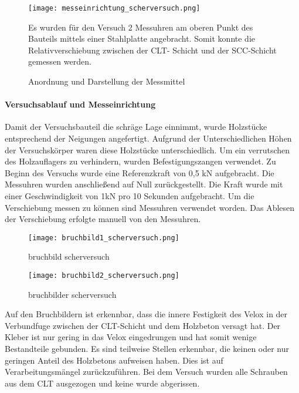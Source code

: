 \documentclass[12 pt,a4 paper ]{scrreprt}
\begin{document}
\begin{figure}[h]
\begin{minipage}[hbt]{8cm}
	\texttt{[image: messeinrichtung\_scherversuch.png]}
	\caption{Anordnung und Darstellung der Messmittel }
	\label{messeinrichtung_scherversuch}
\end{minipage}
\hfill
\begin{minipage}[hbt]{8cm}
Es wurden für den Versuch 2 Messuhren am oberen Punkt des Bauteils mittels einer Stahlplatte angebracht. Somit konnte die Relativverschiebung zwischen der CLT- Schicht und der SCC-Schicht gemessen werden.

\end{minipage}
\end{figure}

\paragraph{Versuchsablauf und Messeinrichtung}
 
Damit der Versuchsbauteil die schräge Lage einnimmt, wurde Holzstücke entsprechend der Neigungen angefertigt. Aufgrund der Unterschiedlichen Höhen der Versuchskörper waren diese Holzstücke unterschiedlich. Um ein verrutschen des Holzauflagers zu verhindern, wurden Befestigungszangen verwendet.
Zu Beginn des Versuchs wurde eine Referenzkraft von 0,5 kN aufgebracht. Die Messuhren wurden anschließend auf Null zurückgestellt.
Die Kraft wurde mit einer Geschwindigkeit von 1kN pro 10 Sekunden aufgebracht. Um die Verschiebung messen zu können sind Messuhren verwendet worden. Das Ablesen der Verschiebung erfolgte manuell von den Messuhren.

\begin{figure}
\begin{minipage}[hbt]{7cm}	
	\texttt{[image: bruchbild1\_scherversuch.png]}
	\caption{bruchbild scherversuch}
	\label{bruchbild scherversuch}
\end{minipage}
\hfill
\begin{minipage}[hbt]{7cm}
	\texttt{[image: bruchbild2\_scherversuch.png]}
	\caption{bruchbilder scherversuch}
	\label{bruchbilder scherversuch}
\end{minipage}
\end{figure}

Auf den Bruchbildern ist erkennbar, dass die innere Festigkeit des Velox in der Verbundfuge zwischen der CLT-Schicht und dem Holzbeton versagt hat. Der Kleber ist nur gering in das Velox eingedrungen und hat somit wenige Bestandteile gebunden. Es sind teilweise Stellen erkennbar, die keinen oder nur geringen Anteil des Holzbetons aufweisen haben. Dies ist auf Verarbeitungsmängel zurückzuführen. Bei dem Versuch wurden alle Schrauben aus dem CLT ausgezogen und keine wurde abgerissen. 
\end{document}
